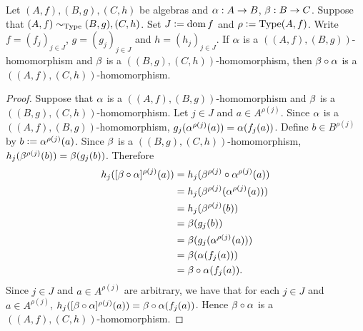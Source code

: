 \documentclass{book}
\begin{document}
	\begin{ex}
		Let $(A, f), (B, g), (C, h)$ be algebras and $\alpha:A \rightarrow B$, $\beta:B \rightarrow C$. Suppose that $(A, f) \sim_{\operatorname{Type}} (B, g), (C, h)$. Set $J \vcentcolon= \operatorname{dom} f$ and $\rho \vcentcolon= \operatorname{Type}(A, f)$. Write $f = (f_j)_{j \in J}$, $g = (g_j)_{j \in J}$ and $h = (h_j)_{j \in J}$. If $\alpha$ is a $((A,f), (B,g))$-homomorphism and $\beta$ is a $((B,g), (C,h))$-homomorphism, then $\beta \circ \alpha$ is a $((A,f), (C,h))$-homomorphism.
	\end{ex}
	
	\begin{proof}
		Suppose that $\alpha$ is a $((A,f), (B,g))$-homomorphism and $\beta$ is a $((B,g), (C,h))$-homomorphism. Let $j \in J$ and $a \in A^{\rho(j)}$. Since $\alpha$ is a $((A,f), (B,g))$-homomorphism, $g_j(\alpha^{\rho(j)}(a)) = \alpha(f_j(a))$. Define $b \in B^{\rho(j)}$  by $b \vcentcolon= \alpha^{\rho(j)}(a)$. Since $\beta$ is a $((B,g), (C,h))$-homomorphism, $h_j(\beta^{\rho(j)}(b)) = \beta(g_j(b))$. Therefore
		\begin{align*}
			h_j([\beta \circ \alpha]^{\rho(j)}(a))  
			 & = h_j(\beta^{\rho(j)} \circ \alpha^{\rho(j)}(a)) \\
			 & = h_j(\beta^{\rho(j)}(\alpha^{\rho(j)}(a))) \\
			 & = h_j(\beta^{\rho(j)}(b)) \\
			 & = \beta(g_j(b)) \\
			 & = \beta(g_j(\alpha^{\rho(j)}(a))) \\
			 & = \beta(\alpha(f_j(a))) \\
			 & = \beta \circ \alpha (f_j(a)).
		\end{align*} 
		Since $j \in J$ and $a \in A^{\rho(j)}$ are arbitrary, we have that for each $j \in J$ and $a \in A^{\rho(j)}$, $h_j([\beta \circ \alpha]^{\rho(j)}(a)) = \beta \circ \alpha (f_j(a))$. Hence $\beta \circ \alpha$ is a $((A,f), (C,h))$-homomorphism.
	\end{proof}
	
\end{document}
